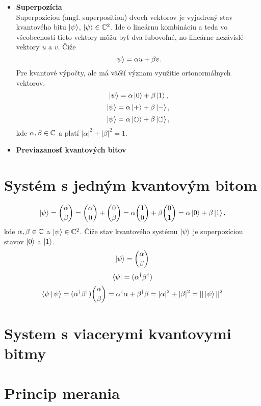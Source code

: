 \begin{itemize}
\item[] \textbf{Superpozícia} \\
Superpozíciou (angl. superposition) dvoch vektorov je vyjadrený stav kvantového bitu \(\Ket{\psi}\), \(\Ket{\psi} \in \mathbb{C}^2\).
Ide o lineárnu kombináciu a teda vo všeobecnosti tieto vektory môžu byť dva ľubovoľné, no lineárne nezávislé vektory \(u\) a \(v\). Čiže
\[\Ket{\psi} = \alpha u + \beta v.\]
Pre kvantové výpočty, ale má väčší význam využitie ortonormálnych vektorov.
\[\Ket{\psi} = \alpha \Ket{0} + \beta \Ket{1},\]
\[\Ket{\psi} = \alpha \Ket{+} + \beta \Ket{-},\]
\[\Ket{\psi} = \alpha \Ket{\circlearrowright} + \beta \Ket{\circlearrowleft},\]
kde \(\alpha, \beta \in \mathbb{C}\) a platí \(|\alpha|^2 + |\beta|^2 = 1\).

\item[] \textbf{Previazanosť kvantových bitov} \\

\end{itemize}

\section{Systém s jedným kvantovým bitom}
\[\Ket{\psi} = \binom{\alpha}{\beta} = \binom{\alpha}{0} + \binom{0}{\beta} = \alpha \binom{1}{0} + \beta \binom{0}{1} = \alpha \Ket{0} + \beta \Ket{1}, \]
kde \(\alpha, \beta \in \mathbb{C}\) a \(\Ket{\psi} \in \mathbb{C}^{2}\).
Čiže stav kvantového systému \(\Ket{\psi}\) je superpozíciou stavov \(\Ket{0}\) a \(\Ket{1}\).
\[\Ket{\psi} = \binom{\alpha}{\beta}\]
\[\Bra{\psi} = (\alpha^{\dag}\beta^{\dag})\]
\[\Braket{\psi|\psi} = (\alpha^{\dag}\beta^{\dag})\binom{\alpha}{\beta} = \alpha^{\dag}\alpha + \beta^{\dag}\beta = |\alpha|^{2} + |\beta|^{2} = ||\Ket{\psi}||^{2}\]


\section{System s viacerymi kvantovymi bitmy}
\section{Princip merania}
